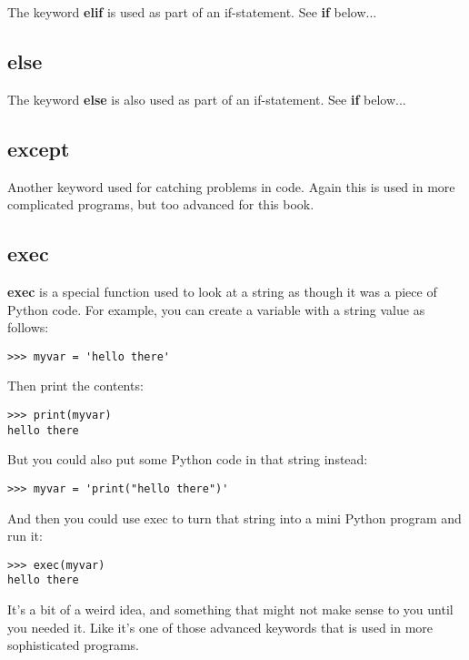The keyword \textbf{elif} is used as part of an if-statement.  See \textbf{if} below...

\subsection*{else}

The keyword \textbf{else} is also used as part of an if-statement.  See \textbf{if} below...

\subsection*{except}

Another keyword used for catching problems in code. Again this is used in more complicated programs, but too advanced for this book.

\subsection*{exec}

\textbf{exec} is a special function used to look at a string as though it was a piece of Python code. For example, you can create a variable with a string value as follows:

\begin{Verbatim}[frame=single]
>>> myvar = 'hello there'
\end{Verbatim}

\noindent
Then print the contents:

\begin{Verbatim}[frame=single]
>>> print(myvar)
hello there
\end{Verbatim}

\noindent
But you could also put some Python code in that string instead:

\begin{Verbatim}[frame=single]
>>> myvar = 'print("hello there")'
\end{Verbatim}

\noindent
And then you could use exec to turn that string into a mini Python program and run it:

\begin{Verbatim}[frame=single]
>>> exec(myvar)
hello there
\end{Verbatim}

It's a bit of a weird idea, and something that might not make sense to you until you needed it.  Like  it's one of those advanced keywords that is used in more sophisticated programs.

